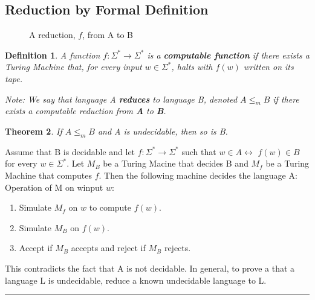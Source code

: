 \documentclass[twoside]{article}
\newcounter{lecnum}
\newtheorem{theorem}{Theorem}[lecnum]
\newtheorem{definition}[theorem]{Definition}
\newenvironment{proof}{{\bf Proof:}}{\hfill\rule{2mm}{2mm}}
\begin{document}
\subsection{Reduction by Formal Definition}
\begin{figure}[h!]
\centering
{}
\caption{A reduction, $f$, from A to B } \label{A reduction, $f$, from A to B }
\end{figure}
\begin{definition}


A function $f: \Sigma^* \rightarrow \Sigma^*$ is a \textbf{computable function} if there exists a Turing Machine that, for every input $w\in \Sigma^*$, halts with $f(w)$ written on its tape. 

Note: We say that language A \textbf{reduces} to language B, denoted $A \leq_m B$ if there exists a computable reduction from \textbf{A} to \textbf{B}.
\end{definition}

\begin{theorem}
If $A \leq_m B$ and A is undecidable, then so is B.
\end{theorem}
\begin{proof}
Assume that B is decidable and let  $f: \Sigma^* \rightarrow \Sigma^*$ such that $w \in A \leftrightarrow$ $f(w) \in B$ for every $w \in \Sigma^*$. Let $M_B$ be a Turing Macine that decides B and $M_f$  be a Turing Machine that computes $f$. Then the following machine decides the language A:\newline
Operation of M on winput $w$:
\begin{enumerate}
\item Simulate  $M_f$ on $w$ to compute $f(w)$.
\item Simulate $M_B$ on $f(w)$.
\item Accept if $M_B$ accepts and reject if $M_B$ rejects.
\end{enumerate}
This contradicts the fact that A is not decidable.\newline
In general, to prove a that a language L is undecidable, reduce a known undecidable language to L. 
\end{proof}
\end{document}
